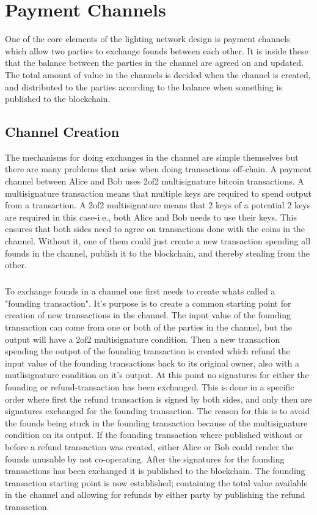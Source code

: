 \documentclass[informationsecurity]{gucmasterproject}
\begin{document}
\chapter{Payment Channels}

One of the core elements of the lighting network design is payment channels which allow two parties to exchange founds between each other.
It is inside these that the balance between the parties in the channel are agreed on and updated.
The total amount of value in the channels is decided when the channel is created, and distributed to the parties according to the balance when something is published to the blockchain.

\section{Channel Creation}
The mechanisms for doing exchanges in the channel are simple themselves but there are many problems that arise when doing transactions off-chain.
A payment channel between Alice and Bob uses 2of2 multisignature bitcoin transactions. A multisignature transaction means that multiple keys are required to spend output from a transaction. A 2of2 multisignature means that 2 keys of a potential 2 keys are required in this case-i.e., both Alice and Bob needs to use their keys. This ensures that both sides need to agree on transactions done with the coins in the channel. Without it, one of them could just create a new transaction spending all founds in the channel, publish it to the blockchain, and thereby stealing from the other.

\paragraph{}
To exchange founds in a channel one first needs to create whats called a "founding transaction". It's purpose is to create a common starting point for creation of new transactions in the channel. The input value of the founding transaction can come from one or both of the parties in the channel, but the output will have a 2of2 multisignature condition. Then a new transaction spending the output of the founding transaction is created which refund the input value of the founding transactions back to its original owner, also with a mutlisignature condition on it's output. At this point no signatures for either the founding or refund-transaction has been exchanged. This is done in a specific order where first the refund transaction is signed by both sides, and only then are signatures exchanged for the founding transaction. The reason for this is to avoid the founds being stuck in the founding transaction because of the multisignature condition on its output. If the founding transaction where published without or before a refund transaction was created, either Alice or Bob could render the founds unusable by not co-operating. After the signatures for the founding transactions has been exchanged it is published to the blockchain. The founding transaction starting point is now established; containing the total value available in the channel and allowing for refunds by either party by publishing the refund transaction.
\end{document}
